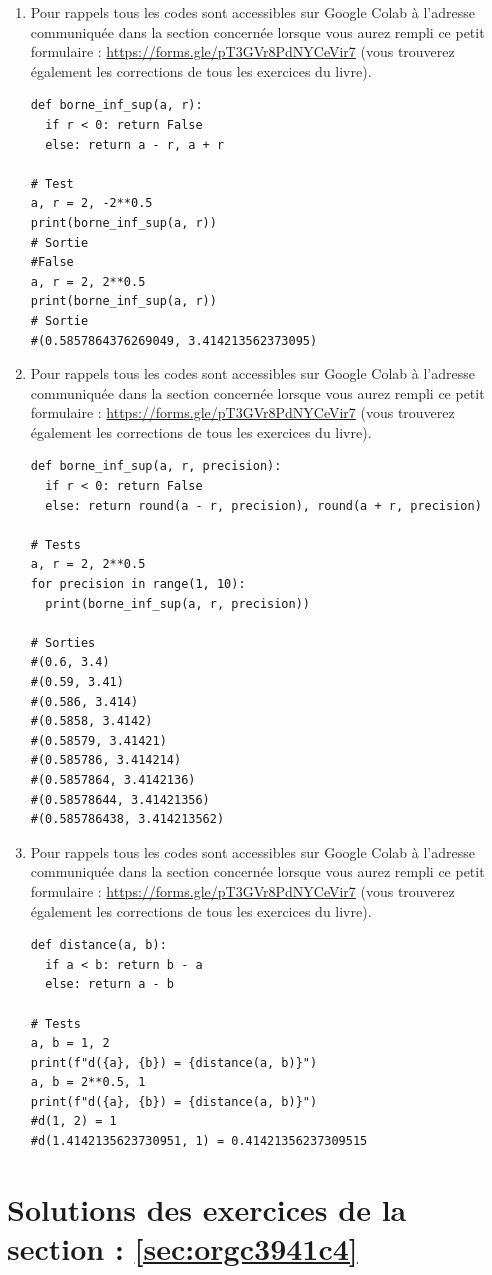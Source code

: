 \documentclass[a4paper, 11pt, twoside]{book}
\begin{document}
\begin{enumerate}
\item Pour rappels tous les codes sont accessibles sur Google Colab à
l'adresse communiquée dans la section concernée lorsque vous
aurez rempli ce petit formulaire :
\url{https://forms.gle/pT3GVr8PdNYCeVir7} (vous trouverez également
les corrections de tous les exercices du livre).
\begin{verbatim}
def borne_inf_sup(a, r):
  if r < 0: return False
  else: return a - r, a + r

# Test
a, r = 2, -2**0.5
print(borne_inf_sup(a, r))
# Sortie
#False
a, r = 2, 2**0.5
print(borne_inf_sup(a, r))
# Sortie
#(0.5857864376269049, 3.414213562373095)
\end{verbatim}
\item Pour rappels tous les codes sont accessibles sur Google Colab à
l'adresse communiquée dans la section concernée lorsque vous
aurez rempli ce petit formulaire :
\url{https://forms.gle/pT3GVr8PdNYCeVir7} (vous trouverez également
les corrections de tous les exercices du livre).
\begin{verbatim}
def borne_inf_sup(a, r, precision):
  if r < 0: return False
  else: return round(a - r, precision), round(a + r, precision)

# Tests
a, r = 2, 2**0.5
for precision in range(1, 10):
  print(borne_inf_sup(a, r, precision))

# Sorties
#(0.6, 3.4)
#(0.59, 3.41)
#(0.586, 3.414)
#(0.5858, 3.4142)
#(0.58579, 3.41421)
#(0.585786, 3.414214)
#(0.5857864, 3.4142136)
#(0.58578644, 3.41421356)
#(0.585786438, 3.414213562)
\end{verbatim}
\item Pour rappels tous les codes sont accessibles sur Google Colab à
l'adresse communiquée dans la section concernée lorsque vous
aurez rempli ce petit formulaire :
\url{https://forms.gle/pT3GVr8PdNYCeVir7} (vous trouverez également
les corrections de tous les exercices du livre).
\begin{verbatim}
def distance(a, b):
  if a < b: return b - a
  else: return a - b

# Tests
a, b = 1, 2
print(f"d({a}, {b}) = {distance(a, b)}")
a, b = 2**0.5, 1
print(f"d({a}, {b}) = {distance(a, b)}")
#d(1, 2) = 1
#d(1.4142135623730951, 1) = 0.41421356237309515
\end{verbatim}
\end{enumerate}
\stopcontents[level-2]

\chapter{Solutions des exercices de la section : \ref{sec:orgc3941c4}}
\label{sec:orgf8915a3}
\startcontents[level-2]
\end{document}

